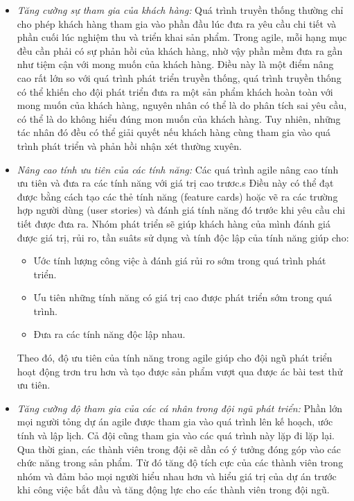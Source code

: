 \documentclass{article}
\begin{document}
\begin{itemize}
	\item \textit{Tăng cường sự tham gia của khách hàng:} Quá trình truyền thống thường chỉ cho phép khách hàng tham gia vào phần đầu lúc đưa ra yêu cầu chi tiết và phần cuối lúc nghiệm thu và triển khai sản phẩm. Trong agile, mỗi hạng mục đều cần phải có sự phản hồi của khách hàng, nhờ vậy phần mềm đưa ra gần như tiệm cận với mong muốn của khách hàng. Điều này là một điểm nâng cao rất lớn so với quá trình phát triển truyền thống, quá trình truyền thống có thể khiến cho đội phát triển đưa ra một sản phẩm khách hoàn toàn với mong muốn của khách hàng, nguyên nhân có thể là do phân tích sai yêu cầu, có thể là do không hiểu đúng mon muốn của khách hàng. Tuy nhiên, những tác nhân đó đều có thể giải quyết nếu khách hàng cùng tham gia vào quá trình phát triển và phản hồi nhận xét thường xuyên.
	
	\item \textit{Nâng cao tính ưu tiên của các tính năng:} Các quá trình agile nâng cao tính ưu tiên và đưa ra các tính năng với giá trị cao trươc.s Điều này có thể đạt được bằng cách tạo các thẻ tính năng (feature cards) hoặc vẽ ra các trường hợp người dùng (user stories) và đánh giá tính năng đó trước khi yêu cầu chi tiết được đưa ra. Nhóm phát triển sẽ giúp khách hàng của mình đánh giá được giá trị, rủi ro, tần suâts sử dụng và tính độc lập của tính năng giúp cho:
	\begin{itemize}
		\item Ước tính lượng công việc à đánh giá rủi ro sớm trong quá trình phát triển.
		\item Ưu tiên những tính năng có giá trị cao được phát triển sớm trong quá trình.
		\item Đưa ra các tính năng độc lập nhau. 
		\end{itemize}
	Theo đó, độ ưu tiên của tính năng trong agile giúp cho đội ngũ phát triển hoạt động trơn tru hơn và tạo được sản phẩm vượt qua được ác bài test thử ưu tiên. 
	
	\item \textit{Tăng cường độ tham gia của các cá nhân trong đội ngũ phát triển:} Phần lớn mọi người tỏng dự án agile được tham gia vào quá trình lên kế hoạch, ước tính và lập lịch. Cả đội cũng tham gia vào các quá trình này lặp đi lặp lại. Qua thời gian, các thành viên trong đội sẽ dần có ý tưởng đóng góp vào các chức năng trong sản phẩm. Từ đó tăng độ tích cực của các thành viên trong nhóm và đảm bảo mọi người hiểu nhau hơn và hiểu giá trị của dự án trước khi công việc bắt đầu và tăng động lực cho các thành viên trong đội ngũ.
	

\end{itemize}
\end{document}
